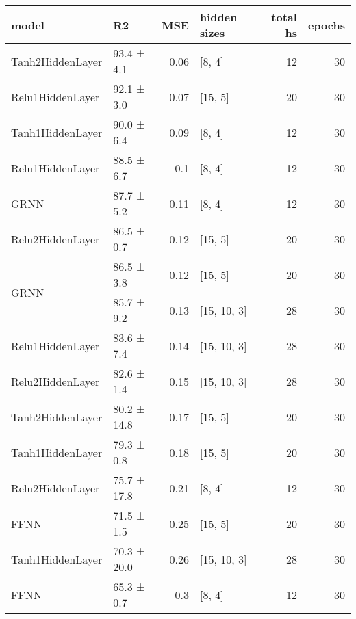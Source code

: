 
    \begin{table*}[h]
        \centering
        \begin{tabular}{llrlrr}
\hline
 model                                      & R2          &   MSE & hidden sizes   &   total hs &   epochs \\
\hline
 \hline
Tanh2HiddenLayer                    & 93.4 ± 4.1  &  0.06 & [8, 4]         &         12 &       30 \\
 \hline
Relu1HiddenLayer                    & 92.1 ± 3.0  &  0.07 & [15, 5]        &         20 &       30 \\
 \hline
Tanh1HiddenLayer                    & 90.0 ± 6.4  &  0.09 & [8, 4]         &         12 &       30 \\
 \hline
Relu1HiddenLayer                    & 88.5 ± 6.7  &  0.1  & [8, 4]         &         12 &       30 \\
 \hline
GRNN                                & 87.7 ± 5.2  &  0.11 & [8, 4]         &         12 &       30 \\
 \hline
Relu2HiddenLayer                    & 86.5 ± 0.7  &  0.12 & [15, 5]        &         20 &       30 \\
 \hline
\multirow{2}{*}{GRNN}               & 86.5 ± 3.8  &  0.12 & [15, 5]        &         20 &       30 \\
                                            & 85.7 ± 9.2  &  0.13 & [15, 10, 3]    &         28 &       30 \\
 \hline
Relu1HiddenLayer                    & 83.6 ± 7.4  &  0.14 & [15, 10, 3]    &         28 &       30 \\
 \hline
Relu2HiddenLayer                    & 82.6 ± 1.4  &  0.15 & [15, 10, 3]    &         28 &       30 \\
 \hline
Tanh2HiddenLayer                    & 80.2 ± 14.8 &  0.17 & [15, 5]        &         20 &       30 \\
 \hline
Tanh1HiddenLayer                    & 79.3 ± 0.8  &  0.18 & [15, 5]        &         20 &       30 \\
 \hline
Relu2HiddenLayer                    & 75.7 ± 17.8 &  0.21 & [8, 4]         &         12 &       30 \\
 \hline
FFNN                                & 71.5 ± 1.5  &  0.25 & [15, 5]        &         20 &       30 \\
 \hline
Tanh1HiddenLayer                    & 70.3 ± 20.0 &  0.26 & [15, 10, 3]    &         28 &       30 \\
 \hline
\multirow{2}{*}{FFNN}               & 65.3 ± 0.7  &  0.3  & [8, 4]         &         12 &       30 \\

\end{tabular}
\end{table*}

